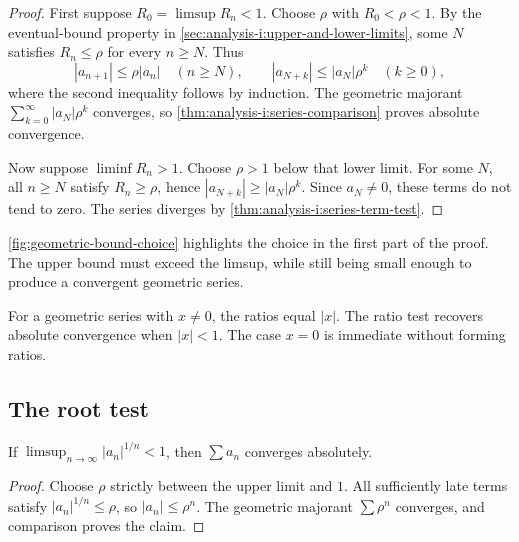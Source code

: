 \begin{proof}
  First suppose $R_0=\limsup R_n<1$. Choose $\rho$ with
  $R_0<\rho<1$. By the eventual-bound property in
  \autoref{sec:analysis-i:upper-and-lower-limits}, some $N$ satisfies
  $R_n\le\rho$ for every $n\ge N$. Thus
  \[
    |a_{n+1}|\le\rho|a_n|\quad(n\ge N),\qquad
    |a_{N+k}|\le|a_N|\rho^k\quad(k\ge0),
  \]
  where the second inequality follows by induction. The geometric
  majorant $\sum_{k=0}^{\infty}|a_N|\rho^k$ converges, so
  \autoref{thm:analysis-i:series-comparison} proves absolute convergence.

  Now suppose $\liminf R_n>1$. Choose $\rho>1$ below that lower
  limit. For some $N$, all $n\ge N$ satisfy $R_n\ge\rho$, hence
  $|a_{N+k}|\ge|a_N|\rho^k$. Since $a_N\ne0$, these terms do not
  tend to zero. The series diverges by
  \autoref{thm:analysis-i:series-term-test}.
\end{proof}

\autoref{fig:geometric-bound-choice} highlights the choice in the first
part of the proof. The upper bound must exceed the limsup, while still
being small enough to produce a convergent geometric series.

\begin{marginfigure}
  \centering
  
  \caption[Choosing an eventual geometric bound.]{Choose $\rho$ in the open interval between $R_0=\limsup R_n$
    and $1$. The tail ratios are eventually below $\rho$, and
    $\sum\rho^k$ converges.}
  \label{fig:geometric-bound-choice}
\end{marginfigure}

For a geometric series with $x\ne0$, the ratios equal $|x|$.
The ratio test recovers absolute convergence when $|x|<1$.
The case $x=0$ is immediate without forming ratios.

\subsection{The root test}

\begin{theorem}
  \label{thm:analysis-i:root-test}
  If $\limsup_{n\to\infty}|a_n|^{1/n}<1$, then $\sum a_n$
  converges absolutely.
\end{theorem}

\begin{proof}
  Choose $\rho$ strictly between the upper limit and $1$.
  All sufficiently late terms satisfy $|a_n|^{1/n}\le\rho$,
  so $|a_n|\le\rho^n$. The geometric majorant $\sum\rho^n$
  converges, and comparison proves the claim.
\end{proof}

